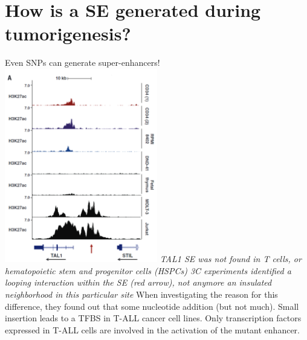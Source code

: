 \hypertarget{how-is-a-se-generated-during-tumorigenesis}{%
\section{How is a SE generated during tumorigenesis?}\label{how-is-a-se-generated-during-tumorigenesis}}

Even SNPs can generate super-enhancers!
\includegraphics[width=0.5\textwidth]{../_resources/c099d4a9ad4bba13e7839f48fd831265.png}
\emph{TAL1 SE was not found in T cells, or hematopoietic stem and progenitor cells (HSPCs)
3C experiments identified a looping interaction within the SE (red arrow), not anymore an insulated neighborhood in this particular site}
When investigating the reason for this difference, they found out that some nucleotide addition (but not much). Small insertion leads to a TFBS in T-ALL cancer cell lines. Only transcription factors expressed in T-ALL cells are involved in the activation of the mutant enhancer.


